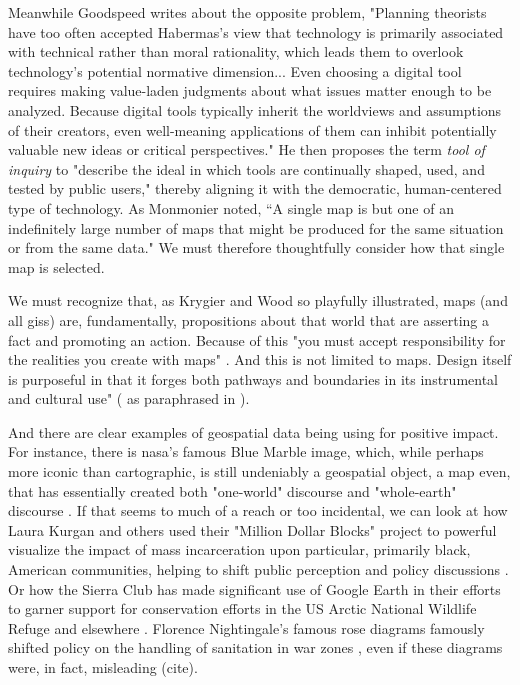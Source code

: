 Meanwhile Goodspeed writes about the opposite problem, "Planning theorists have too often accepted Habermas's view that technology is primarily associated with technical rather than moral rationality, which leads them to overlook technology's potential normative dimension... Even choosing a digital tool requires making value-laden judgments about what issues matter enough to be analyzed. Because digital tools typically inherit the worldviews and assumptions of their creators, even well-meaning applications of them can inhibit potentially valuable new ideas or critical perspectives." He then proposes the term \textit{tool of inquiry} to "describe the ideal in which tools are continually shaped, used, and tested by public users," \cite{goodspeedScenarioPlanningCities2020} thereby aligning it with the democratic, human-centered type of technology. As Monmonier noted, ``A single map is but one of an indefinitely large number of maps that might be produced for the same situation or from the same data." \cite{monmonierHowLieMaps1996} We must therefore thoughtfully consider how that single map is selected.

We must recognize that, as Krygier and Wood so playfully illustrated, maps (and all \acp{gis}) are, fundamentally, propositions about that world that are asserting a fact and promoting an action. Because of this "you must accept responsibility for the realities you create with maps" \cite{krygierCeEstPas2011}. And this is not limited to maps. Design itself is purposeful in that it forges both pathways and boundaries in its instrumental and cultural use" (\cite{paceyCultureTechnology1983} as paraphrased in \cite{nobleAlgorithmsOppressionHow2018}). 

And there are clear examples of geospatial data being using for positive impact. For instance, there is \ac{nasa}'s famous Blue Marble image, which, while perhaps more iconic than cartographic, is still undeniably a geospatial object, a map even, that has essentially created both "one-world" discourse and "whole-earth" discourse \cite{propenCartographicRepresentationConstruction2011}. If that seems to much of a reach or too incidental, we can look at how Laura Kurgan and others used their "Million Dollar Blocks" project to powerful visualize the impact of mass incarceration upon particular, primarily black, American communities, helping to shift public perception and policy discussions \cite{kurganCloseDistanceMapping2013}. Or how the Sierra Club has made significant use of Google Earth in their efforts to garner support for conservation efforts in the US Arctic National Wildlife Refuge and elsewhere \cite{propenCartographicRepresentationConstruction2011}. Florence Nightingale's famous rose diagrams famously shifted policy on the handling of sanitation in war zones \cite{friendlyBriefHistoryData2008}, even if these diagrams were, in fact, misleading (cite).

